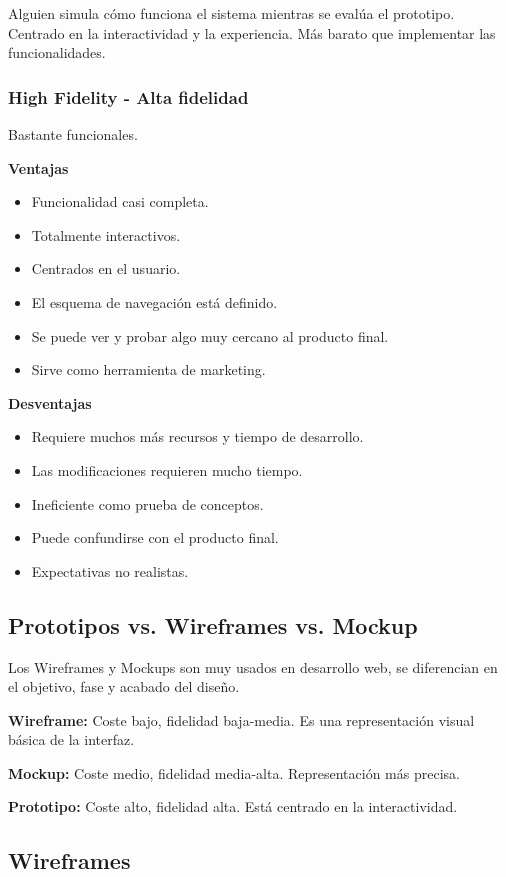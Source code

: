 \documentclass[12pt, twoside, openright]{report} %
\begin{document}
  Alguien simula cómo funciona el sistema mientras se evalúa el prototipo. Centrado en la interactividad y la experiencia. Más barato que implementar las funcionalidades.

  \subsubsection{High Fidelity - Alta fidelidad}
  Bastante funcionales.

  \textbf{Ventajas}
  \begin{itemize}
    \item Funcionalidad casi completa.
    \item Totalmente interactivos.
    \item Centrados en el usuario.
    \item El esquema de navegación está definido.
    \item Se puede ver y probar algo muy cercano al producto final.
    \item Sirve como herramienta de marketing.
  \end{itemize}

  \textbf{Desventajas}
  \begin{itemize}
    \item Requiere muchos más recursos y tiempo de desarrollo.
    \item Las modificaciones requieren mucho tiempo.
    \item Ineficiente como prueba de conceptos.
    \item Puede confundirse con el producto final.
    \item Expectativas no realistas.
  \end{itemize}

\subsection{Prototipos vs. Wireframes vs. Mockup}
Los Wireframes y Mockups son muy usados en desarrollo web, se diferencian en el objetivo, fase y acabado del diseño.

\textbf{Wireframe:} Coste bajo, fidelidad baja-media. Es una representación visual básica de la interfaz.

\textbf{Mockup:} Coste medio, fidelidad media-alta. Representación más precisa.

\textbf{Prototipo:} Coste alto, fidelidad alta. Está centrado en la interactividad.

\subsection{Wireframes}
\end{document}
